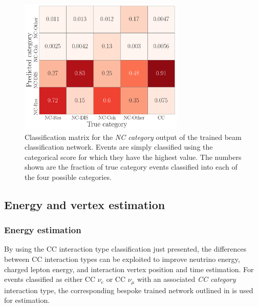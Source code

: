 \begin{figure} %
    \includegraphics[width=0.7\textwidth]{diagrams/7-results/final_nc_cat_confusion.pdf}
    \caption[Classification matrix for the NC category output of the beam classification network]
    {Classification matrix for the \emph{NC category} output of the trained beam classification
        network. Events are simply classified using the categorical score for which they have the
        highest value. The numbers shown are the fraction of true category events classified into
        each of the four possible categories.}
    \label{fig:final_nc_cat_confusion}
\end{figure}

\subsection{Energy and vertex estimation} %
\label{sec:results_eval_energy} %

\subsubsection*{Energy estimation} %

By using the CC interaction type classification just presented, the differences between CC
interaction types can be exploited to improve neutrino energy, charged lepton energy, and
interaction vertex position and time estimation. For events classified as either CC $\nu_{e}$ or
CC $\nu_{\mu}$ with an associated \emph{CC category} interaction type, the corresponding bespoke
trained network outlined in  is used for estimation.

